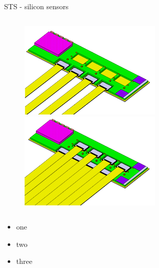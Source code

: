 \begin{columnframe}{STS - silicon sensors}
    \begin{column}{0.5\textwidth}
        \begin{figure}
            \centering
            \includegraphics[width=0.6\textwidth, frame]{images/sts_strips_1.png}
            \includegraphics[width=0.6\textwidth, frame]{images/sts_strips_2.png}
        \end{figure}
    \end{column}
    \begin{column}{0.5\textwidth}
        \begin{itemize}
            \item one
            \item two
            \item three
        \end{itemize}
    \end{column}
\end{columnframe}
